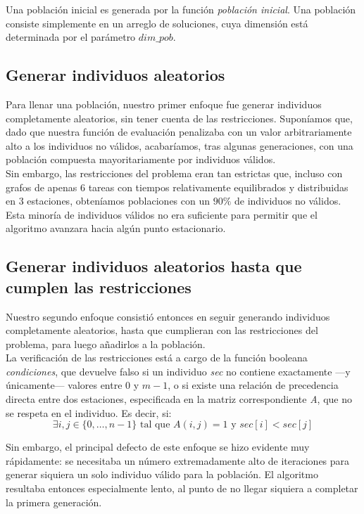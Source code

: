 \documentclass[12pt]{report}
\begin{document}
Una población inicial es generada por la función \textit{población inicial}. Una población consiste simplemente en un arreglo de soluciones, cuya dimensión está determinada por el parámetro $dim\_pob$.

\subsection*{Generar individuos aleatorios}

Para llenar una población, nuestro primer enfoque fue generar individuos completamente aleatorios, sin tener cuenta de las restricciones. Suponíamos que, dado que nuestra función de evaluación penalizaba con un valor arbitrariamente alto a los individuos no válidos, acabaríamos, tras algunas generaciones, con una población compuesta mayoritariamente por individuos válidos.\\

Sin embargo, las restricciones del problema eran tan estrictas que, incluso con grafos de apenas $6$ tareas con tiempos relativamente equilibrados y distribuidas en $3$ estaciones, obteníamos poblaciones con un $90\%$ de individuos no válidos.
Esta minoría de individuos válidos no era suficiente para permitir que el algoritmo avanzara hacia algún punto estacionario.

\subsection*{Generar individuos aleatorios hasta que cumplen las restricciones}

Nuestro segundo enfoque consistió entonces en seguir generando individuos completamente aleatorios, hasta que cumplieran con las restricciones del problema, para luego añadirlos a la población.\\

La verificación de las restricciones está a cargo de la función booleana \textit{condiciones}, que devuelve falso si un individuo \textit{sec} no contiene exactamente —y únicamente— valores entre $0$ y $m-1$, o si existe una relación de precedencia directa entre dos estaciones, especificada en la matriz correspondiente \textit{A}, que no se respeta en el individuo. Es decir, si:
\[
\exists i,j \in \{0,\dots,n-1\} \text{ tal que } A(i,j) = 1 \text{ y } sec[i] < sec[j]
\]

Sin embargo, el principal defecto de este enfoque se hizo evidente muy rápidamente: se necesitaba un número extremadamente alto de iteraciones para generar siquiera un solo individuo válido para la población.
El algoritmo resultaba entonces especialmente lento, al punto de no llegar siquiera a completar la primera generación.
\end{document}
